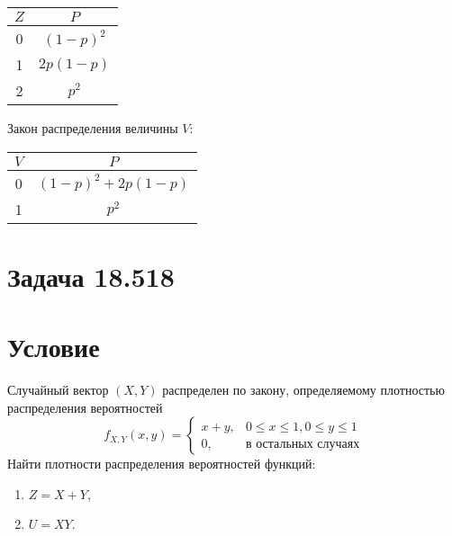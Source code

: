 \begin{tabular}{|c|c|}
    \hline
    $Z$ & $P$         \\
    \hline
    0   & $(1-p)^2$   \\
    \hline
    1   & $2 p (1-p)$ \\
    \hline
    2   & $p^2$       \\
    \hline
\end{tabular}

Закон распределения величины $V$:

\begin{tabular}{|c|c|}
    \hline
    $V$ & $P$                   \\
    \hline
    0   & $(1-p)^2 + 2 p (1-p)$ \\
    \hline
    1   & $p^2$                 \\
    \hline
\end{tabular}


\section{Задача 18.518}
\section*{Условие}
Случайный вектор $\left ( X, Y \right )$ распределен по закону, определяемому плотностью распределения вероятностей
$$
f_{X, Y} ( x, y )
= \left \{
\begin{array}{ll}
    x + y, & 0 \le x \le 1, 0 \le y \le 1 \\
    0,     & \text{в остальных случаях}
\end{array}
\right .
$$
Найти плотности распределения вероятностей функций:
\begin{enumerate}
    \item $Z = X + Y$,
    \item $U = XY$.
\end{enumerate}

